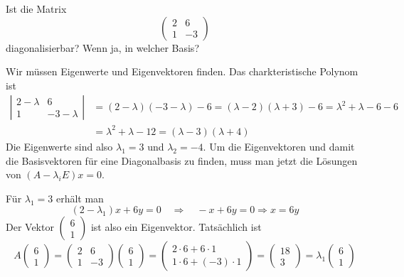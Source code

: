 Ist die Matrix
\[
\begin{pmatrix}
2&6\\
1&-3
\end{pmatrix}
\]
diagonalisierbar? Wenn ja, in welcher Basis?

\begin{loesung}
Wir müssen Eigenwerte und Eigenvektoren finden. Das charkteristische
Polynom ist
\begin{align*}
\left|\begin{matrix}
2-\lambda&6\\
1&-3-\lambda
\end{matrix}\right|
&=(2-\lambda)(-3-\lambda)-6=(\lambda-2)(\lambda+3)-6=\lambda^2+\lambda-6-6
\\
&=\lambda^2+\lambda-12=(\lambda-3)(\lambda + 4)
\end{align*}
Die Eigenwerte sind also $\lambda_1=3$ und $\lambda_2=-4$. Um die Eigenvektoren und damit
die Basisvektoren für eine Diagonalbasis zu finden, muss man
jetzt die Lösungen von $(A-\lambda_i E)x=0$.

Für $\lambda_1=3$ erhält man
\[
(2-\lambda_1)x+6y=0\quad\Rightarrow\quad -x+6y=0\Rightarrow x = 6y
\]
Der Vektor
$\begin{pmatrix}6\\1\end{pmatrix}$
ist also ein Eigenvektor. Tatsächlich ist
\[
A\begin{pmatrix}6\\1\end{pmatrix}
=
\begin{pmatrix}
2&6\\
1&-3
\end{pmatrix}
\begin{pmatrix}6\\1\end{pmatrix}
=\begin{pmatrix}
2\cdot 6+6\cdot 1\\
1\cdot 6+(-3)\cdot 1
\end{pmatrix}
=\begin{pmatrix}
18\\
3
\end{pmatrix}
=
\lambda_1 
\begin{pmatrix}6\\1\end{pmatrix}
\]


\end{loesung}

